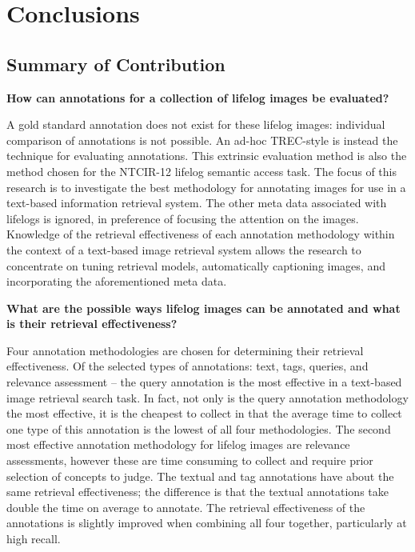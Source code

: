 \chapter{Conclusions}

\section{Summary of Contribution}

\textbf{How can annotations for a collection of lifelog images be evaluated?}

A gold standard annotation does not exist for these lifelog images: individual comparison of annotations is not possible. An ad-hoc TREC-style is instead the technique for evaluating annotations. This extrinsic evaluation method is also the method chosen for the NTCIR-12 lifelog semantic access task. The focus of this research is to investigate the best methodology for annotating images for use in a text-based information retrieval system. The other meta data associated with lifelogs is ignored, in preference of focusing the attention on the images. Knowledge of the retrieval effectiveness of each annotation methodology within the context of a text-based image retrieval system allows the research to concentrate on tuning retrieval models, automatically captioning images, and incorporating the aforementioned meta data. 

\textbf{What are the possible ways lifelog images can be annotated and what is their retrieval effectiveness?
}

Four annotation methodologies are chosen for determining their retrieval effectiveness. Of the selected types of annotations: text, tags, queries, and relevance assessment -- the query annotation is the most effective in a text-based image retrieval search task. In fact, not only is the query annotation methodology the most effective, it is the cheapest to collect in that the average time to collect one type of this annotation is the lowest of all four methodologies. The second most effective annotation methodology for lifelog images are relevance assessments, however these are time consuming to collect and require prior selection of concepts to judge. The textual and tag annotations have about the same retrieval effectiveness; the difference is that the textual annotations take double the time on average to annotate. The retrieval effectiveness of the annotations is slightly improved when combining all four together, particularly at high recall.

